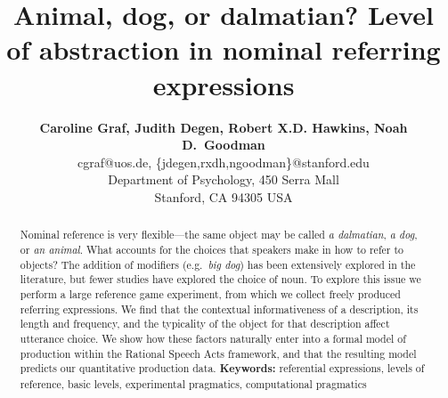 \documentclass[10pt,letterpaper]{article}
\title{Animal, dog, or dalmatian? Level of abstraction in nominal referring expressions}
\author{{\large \bf Caroline Graf, Judith Degen, Robert X.D. Hawkins, Noah D.~Goodman} \\
  cgraf@uos.de, \{jdegen,rxdh,ngoodman\}@stanford.edu\\
  Department of Psychology, 450 Serra Mall \\
  Stanford, CA 94305 USA}
\newcommand{\red}[1]{\textcolor{Red}{#1}}
\begin{document}
\maketitle


\begin{abstract}


Nominal reference is very flexible---the same object may be called \emph{a dalmatian}, \emph{a dog}, or \emph{an animal}.
What accounts for the choices that speakers make in how to refer to objects?
The addition of modifiers (e.g.~\emph{big dog}) has been extensively explored in the literature, but fewer studies have explored the choice of noun.
To explore this issue we perform a large reference game experiment, from which we collect freely produced referring expressions.
We find that the contextual informativeness of a description, its length and frequency, and the typicality of the object for that description affect utterance choice.
We show how these factors naturally enter into a formal model of production within the Rational Speech Acts framework, and that the resulting model predicts our quantitative production data.
\textbf{Keywords:} 
referential expressions, levels of reference, basic levels, experimental pragmatics, computational pragmatics
\end{abstract}
\end{document}
